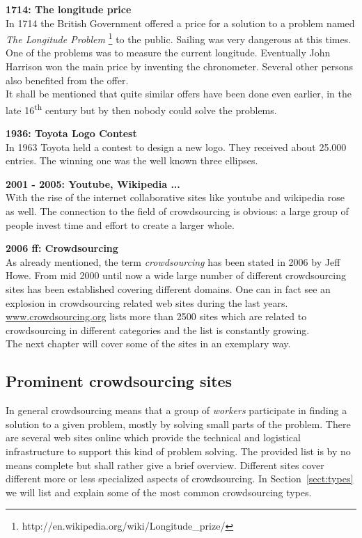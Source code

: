 \documentclass{acm_proc_article-sp}
\begin{document}
\textbf{1714: The longitude price}\\
In 1714 the British Government offered a price for a solution to a problem named \textit{The Longitude Problem} \footnote{http://en.wikipedia.org/wiki/Longitude\_prize/} to the public. Sailing was very dangerous at this times. One of the problems was to measure the current longitude. Eventually John Harrison won the main price by inventing the chronometer. Several other persons also benefited from the offer.\\
It shall be mentioned that quite similar offers have been done even earlier, in the late 16\textsuperscript{th} century but by then nobody could solve the problems.

\textbf{1936: Toyota Logo Contest}\\
In 1963 Toyota held a contest to design a new logo. They received about 25.000 entries. The winning one was the well known three ellipses.

\textbf{2001 - 2005: Youtube, Wikipedia ...}\\
With the rise of the internet collaborative sites like youtube and wikipedia rose as well. The connection to the field of crowdsourcing is obvious: a large group of people invest time and effort to create a larger whole.

\textbf{2006 ff: Crowdsourcing}\\
As already mentioned, the term \textit{crowdsourcing} has been stated in 2006 by Jeff Howe. From mid 2000 until now a wide large number of different crowdsourcing sites has been established covering different domains. One can in fact see an explosion in crowdsourcing related web sites during the last years. \href{http://www.crowdsourcing.org/directory}{www.crowdsourcing.org} lists more than 2500 sites which are related to crowdsourcing in different categories and the list is constantly growing.\\
The next chapter will cover some of the sites in an exemplary way.

\subsection{Prominent crowdsourcing sites}
In general crowdsourcing means that a group of \textit{workers} participate in finding a solution to a given problem, mostly by solving small parts of the problem. There are several web sites online which provide the technical and logistical infrastructure to support this kind of problem solving. The provided list is by no means complete but shall rather give a brief overview. Different sites cover different more or less specialized aspects of crowdsourcing. In Section~\ref{sect:types} we will list and explain some of the most common crowdsourcing types.
\end{document}
